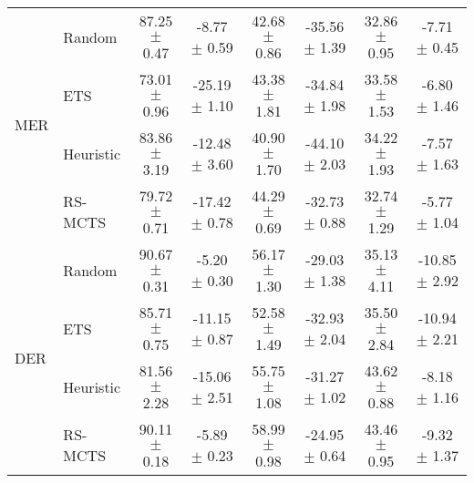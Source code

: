 \begin{tabular}{llcccccc}
	\multirow{4}{*}{MER}   & Random            & 87.25 $\pm$ 0.47  & -8.77 $\pm$ 0.59   & 42.68 $\pm$ 0.86  & -35.56 $\pm$ 1.39  & 32.86 $\pm$ 0.95    & -7.71 $\pm$ 0.45    \\
	& ETS               & 73.01 $\pm$ 0.96  & -25.19 $\pm$ 1.10  & 43.38 $\pm$ 1.81  & -34.84 $\pm$ 1.98  & 33.58 $\pm$ 1.53    & -6.80 $\pm$ 1.46    \\
	& Heuristic           & 83.86 $\pm$ 3.19  & -12.48 $\pm$ 3.60  & 40.90 $\pm$ 1.70  & -44.10 $\pm$ 2.03  & 34.22 $\pm$ 1.93    & -7.57 $\pm$ 1.63    \\
	& RS-MCTS              & 79.72 $\pm$ 0.71  & -17.42 $\pm$ 0.78  & 44.29 $\pm$ 0.69  & -32.73 $\pm$ 0.88  & 32.74 $\pm$ 1.29    & -5.77 $\pm$ 1.04    \\ \midrule
	\multirow{4}{*}{DER}   & Random            & 90.67 $\pm$ 0.31  & -5.20 $\pm$ 0.30   & 56.17 $\pm$ 1.30  & -29.03 $\pm$ 1.38  & 35.13 $\pm$ 4.11    & -10.85 $\pm$ 2.92   \\
	& ETS               & 85.71 $\pm$ 0.75  & -11.15 $\pm$ 0.87  & 52.58 $\pm$ 1.49  & -32.93 $\pm$ 2.04  & 35.50 $\pm$ 2.84    & -10.94 $\pm$ 2.21   \\
	& Heuristic           & 81.56 $\pm$ 2.28  & -15.06 $\pm$ 2.51  & 55.75 $\pm$ 1.08  & -31.27 $\pm$ 1.02  & 43.62 $\pm$ 0.88    & -8.18 $\pm$ 1.16    \\
	& RS-MCTS              & 90.11 $\pm$ 0.18  & -5.89 $\pm$ 0.23   & 58.99 $\pm$ 0.98  & -24.95 $\pm$ 0.64  & 43.46 $\pm$ 0.95    & -9.32 $\pm$ 1.37    \\ \midrule
\end{tabular}